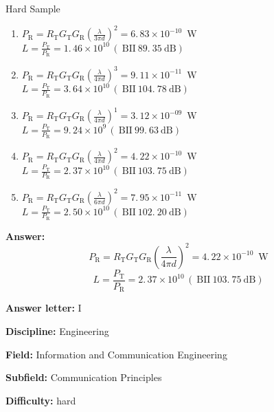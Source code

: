 \begin{hardbox}{Hard Sample}
\begin{enumerate}[leftmargin=1cm, label=\Alph*)]
    \item \( P_{\mathrm{R}}=R_{\mathrm{T}} G_{\mathrm{T}} G_{\mathrm{R}} \left( \frac{\lambda} {3 \pi d} \right)^{2}=6. \, 8 3 \times1 0^{-1 0} \, \, \, \mathrm{W} \) \\
          \( L={\frac{P_{\mathrm{T}}} {P_{\mathrm{R}}}}=1. \, 4 6 \times1 0^{1 0} \, ( \mathrm{~ B I I ~ 8 9. ~  35 ~ d B} ) \)
    \item \( P_{\mathrm{R}}=R_{\mathrm{T}} G_{\mathrm{T}} G_{\mathrm{R}} \left( \frac{\lambda} {4 \pi d} \right)^{3}=9. \, 1 1 \times1 0^{-1 1} \, \, \, \mathrm{W} \) \\
          \( L={\frac{P_{\mathrm{T}}} {P_{\mathrm{R}}}}=3. \, 6 4 \times1 0^{1 0} \, ( \mathrm{~ B I I ~ 1 0 4. ~ 7 8 ~ d B} ) \)
    \item \( P_{\mathrm{R}}=R_{\mathrm{T}} G_{\mathrm{T}} G_{\mathrm{R}} \left( \frac{\lambda} {4 \pi d} \right)^{1}=3. \, 1 2 \times1 0^{-0 9} \, \, \, \mathrm{W} \) \\
          \( L={\frac{P_{\mathrm{T}}} {P_{\mathrm{R}}}}=9. \, 2 4 \times1 0^{9} \, ( \mathrm{~ B I I ~ 9 9. ~ 6 3 ~ d B} ) \)
    \item \( P_{\mathrm{R}}=R_{\mathrm{T}} G_{\mathrm{T}} G_{\mathrm{R}} \left( \frac{\lambda} {4 \pi d} \right)^{2}=4. \, 2 2 \times1 0^{-1 0} \, \, \, \mathrm{W} \) \\
          \( L={\frac{P_{\mathrm{T}}} {P_{\mathrm{R}}}}=2. \, 3 7 \times1 0^{1 0} \, ( \mathrm{~ B I I ~ 1 0 3. ~ 7 5 ~ d B} ) \)
    \item \( P_{\mathrm{R}}=R_{\mathrm{T}} G_{\mathrm{T}} G_{\mathrm{R}} \left( \frac{\lambda} {6 \pi d} \right)^{2}=7. \, 9 5 \times1 0^{-1 1} \, \, \, \mathrm{W} \) \\
          \( L={\frac{P_{\mathrm{T}}} {P_{\mathrm{R}}}}=2. \, 5 0 \times1 0^{1 0} \, ( \mathrm{~ B I I ~ 1 0 2. ~ 2 0 ~ d B} ) \)
\end{enumerate}

\textbf{Answer:}
\[
P_{\mathrm{R}}=R_{\mathrm{T}} G_{\mathrm{T}} G_{\mathrm{R}} \left( \frac{\lambda} {4 \pi d} \right)^{2}=4. \, 2 2 \times1 0^{-1 0} \, \, \, \mathrm{W}
\]
\[
L={\frac{P_{\mathrm{T}}} {P_{\mathrm{R}}}}=2. \, 3 7 \times1 0^{1 0} \, ( \mathrm{~ B I I ~ 1 0 3. ~ 7 5 ~ d B} )
\]

\textbf{Answer letter:} I

\textbf{Discipline:} Engineering

\textbf{Field:} Information and Communication Engineering

\textbf{Subfield:} Communication Principles

\textbf{Difficulty:} hard

\end{hardbox}